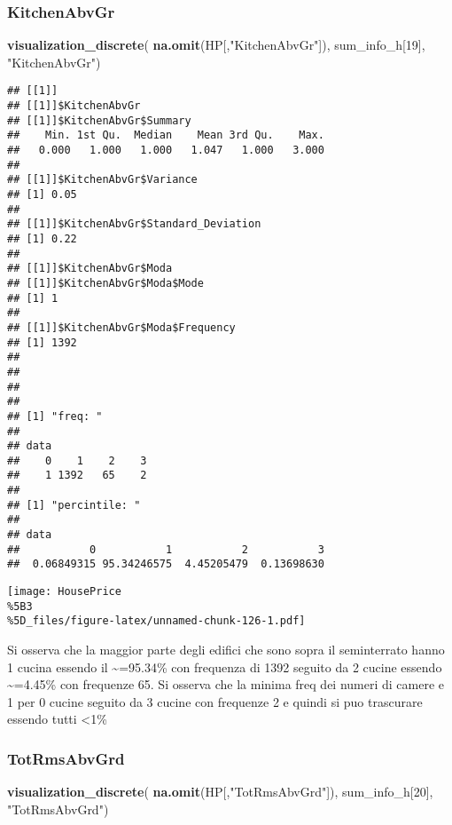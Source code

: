 \documentclass[
]{article}
\newenvironment{Shaded}{\begin{snugshade}}{\end{snugshade}}
\newcommand{\DecValTok}[1]{\textcolor[rgb]{0.00,0.00,0.81}{#1}}
\newcommand{\FunctionTok}[1]{\textcolor[rgb]{0.13,0.29,0.53}{\textbf{#1}}}
\newcommand{\NormalTok}[1]{#1}
\newcommand{\StringTok}[1]{\textcolor[rgb]{0.31,0.60,0.02}{#1}}
\begin{document}
\subsubsection{KitchenAbvGr}\label{kitchenabvgr}

\begin{Shaded}
\begin{Highlighting}[]
\FunctionTok{visualization\_discrete}\NormalTok{(}
  \FunctionTok{na.omit}\NormalTok{(HP[,}\StringTok{"KitchenAbvGr"}\NormalTok{]),}
\NormalTok{  sum\_info\_h[}\DecValTok{19}\NormalTok{],}
  \StringTok{"KitchenAbvGr"}\NormalTok{)}
\end{Highlighting}
\end{Shaded}

\begin{verbatim}
## [[1]]
## [[1]]$KitchenAbvGr
## [[1]]$KitchenAbvGr$Summary
##    Min. 1st Qu.  Median    Mean 3rd Qu.    Max. 
##   0.000   1.000   1.000   1.047   1.000   3.000 
## 
## [[1]]$KitchenAbvGr$Variance
## [1] 0.05
## 
## [[1]]$KitchenAbvGr$Standard_Deviation
## [1] 0.22
## 
## [[1]]$KitchenAbvGr$Moda
## [[1]]$KitchenAbvGr$Moda$Mode
## [1] 1
## 
## [[1]]$KitchenAbvGr$Moda$Frequency
## [1] 1392
## 
## 
## 
## 
## [1] "freq: "
## 
## data
##    0    1    2    3 
##    1 1392   65    2 
## 
## [1] "percintile: "
## 
## data
##           0           1           2           3 
##  0.06849315 95.34246575  4.45205479  0.13698630
\end{verbatim}

\texttt{[image: HousePrice\\\%5B3\\\%5D\_files/figure-latex/unnamed-chunk-126-1.pdf]}

Si osserva che la maggior parte degli edifici che sono sopra il
seminterrato hanno 1 cucina essendo il \textasciitilde=95.34\% con
frequenza di 1392 seguito da 2 cucine essendo \textasciitilde=4.45\% con
frequenze 65. Si osserva che la minima freq dei numeri di camere e 1 per
0 cucine seguito da 3 cucine con frequenze 2 e quindi si puo trascurare
essendo tutti \textless1\%

\subsubsection{TotRmsAbvGrd}\label{totrmsabvgrd}

\begin{Shaded}
\begin{Highlighting}[]
\FunctionTok{visualization\_discrete}\NormalTok{(}
  \FunctionTok{na.omit}\NormalTok{(HP[,}\StringTok{"TotRmsAbvGrd"}\NormalTok{]),}
\NormalTok{  sum\_info\_h[}\DecValTok{20}\NormalTok{],}
  \StringTok{"TotRmsAbvGrd"}\NormalTok{)}
\end{Highlighting}
\end{Shaded}
\end{document}
